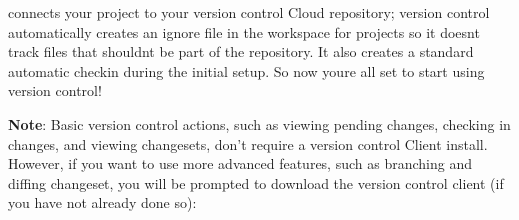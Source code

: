  connects your project to your version control Cloud repository; version control automatically creates an ignore file in the workspace for  projects so it doesn\textquotesingle{}t track files that shouldn\textquotesingle{}t be part of the repository. It also creates a standard automatic checkin during the initial setup. So now you\textquotesingle{}re all set to start using version control!



{\bfseries{Note}}\+: Basic version control actions, such as viewing pending changes, checking in changes, and viewing changesets, don’t require a version control Client install. However, if you want to use more advanced features, such as branching and diffing changeset, you will be prompted to download the version control client (if you have not already done so)\+:

 